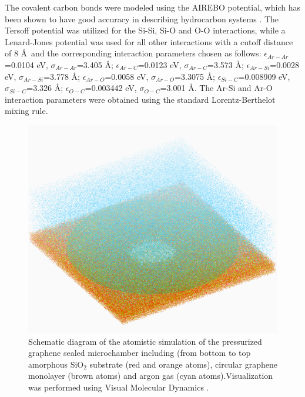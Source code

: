 The covalent carbon bonds were modeled using the AIREBO \cite{stuartJCP2000} potential, which has been shown to have good accuracy in describing hydrocarbon systems \cite{qiNANO2010,zhaoJAP2010}.
The Tersoff \cite{tersoffPRB1988} potential was utilized for the Si-Si, Si-O and O-O interactions, while a Lenard-Jones potential was used for all other interactions with a cutoff distance of 8 \AA \ and the corresponding interaction parameters chosen as follows: $\epsilon_{Ar-Ar}$=0.0104 eV, $\sigma_{Ar-Ar}$=3.405 \AA \cite{RytkonenJchemp1998}; $\epsilon_{Ar-C}$=0.0123 eV, $\sigma_{Ar-C}$=3.573 \AA \cite{RobertNano1996}; $\epsilon_{Ar-Si}$=0.0028 eV, $\sigma_{Ar-Si}$=3.778 \AA \cite{LiPRA2010}; $\epsilon_{Ar-O}$=0.0058 eV, $\sigma_{Ar-O}$=3.3075 \AA \cite{EverittJCP1999}; $\epsilon_{Si-C}$=0.008909 eV, $\sigma_{Si-C}$=3.326 \AA \cite{OngPRB2010}; $\epsilon_{O-C}$=0.003442 eV, $\sigma_{O-C}$=3.001 \AA \cite{OngPRB2010}.
The Ar-Si and Ar-O interaction parameters were obtained using the standard Lorentz-Berthelot mixing rule.

\begin{figure}
	\begin{center}
	\includegraphics[scale=0.12]{Figs_Friction/MD.pdf}
	\end{center}
	\caption[Schematic diagram of the atomistic simulation]{\label{fig:fri:MD}
	Schematic diagram of the atomistic simulation of the pressurized graphene sealed microchamber including (from bottom to top amorphous SiO$_{2}$ substrate (red and orange atoms), circular graphene monolayer (brown atoms) and argon gas (cyan atoms).Visualization was performed using Visual Molecular Dynamics \cite{Humphrey1996}.}
\end{figure}

